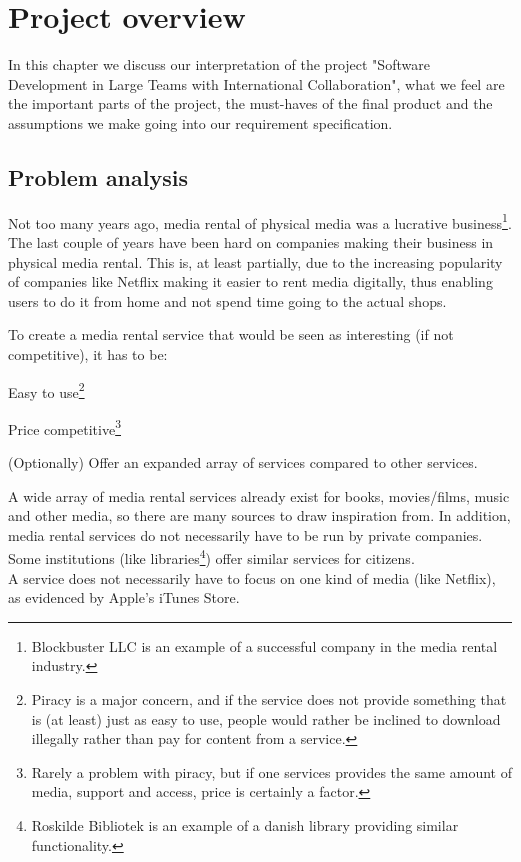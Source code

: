 \chapter{Project overview}
\label{Overview}
In this chapter we discuss our interpretation of the project "Software Development in Large Teams with International Collaboration", what we feel are the important parts of the project, the must-haves of the final product and the assumptions we make going into our requirement specification.
\section{Problem analysis}
\label{Overview_analysis}
Not too many years ago, media rental of physical media was a lucrative business\footnote{Blockbuster LLC\cite{Block-wiki} is an example of a successful company in the media rental industry.}. The last couple of years have been hard on companies making their business in physical media rental\cite{Block-loss}. This is, at least partially, due to the increasing popularity of companies like Netflix\cite{Netflix-wiki} making it easier to rent media digitally, thus enabling users to do it from home and not spend time going to the actual shops.

To create a media rental service that would be seen as interesting (if not competitive), it has to be:
\begin{my_itemize}
\item Easy to use\footnote{Piracy is a major concern, and if the service does not provide something that is (at least) just as easy to use, people would rather be inclined to download illegally rather than pay for content from a service\cite{GN-interview}.}
\item Price competitive\footnote{Rarely a problem with piracy, but if one services provides the same amount of media, support and access, price is certainly a factor.}
\item (Optionally) Offer an expanded array of services compared to other services.
\end{my_itemize}

A wide array of media rental services already exist for books, movies/films, music and other media, so there are many sources to draw inspiration from. In addition, media rental services do not necessarily have to be run by private companies. Some institutions (like libraries\footnote{Roskilde Bibliotek is an example of a danish library providing similar functionality\cite{rosbib}.}) offer similar services for citizens.\\
A service does not necessarily have to focus on one kind of media (like Netflix), as evidenced by Apple's iTunes Store\cite{ITstore}. 

